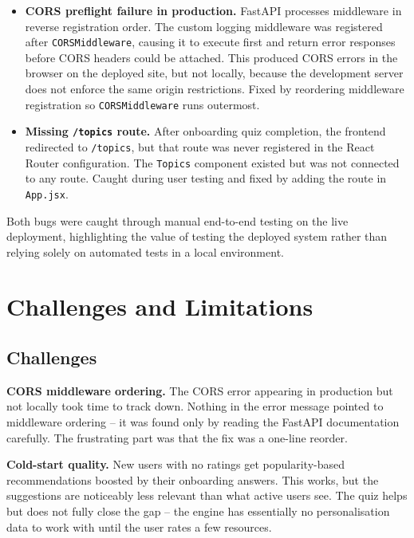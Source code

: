\documentclass[12pt,a4paper]{report}
\begin{document}
\begin{itemize}
  \item \textbf{CORS preflight failure in production.} FastAPI processes middleware in reverse registration order. The custom logging middleware was registered after \texttt{CORSMiddleware}, causing it to execute first and return error responses before CORS headers could be attached. This produced CORS errors in the browser on the deployed site, but not locally, because the development server does not enforce the same origin restrictions. Fixed by reordering middleware registration so \texttt{CORSMiddleware} runs outermost.
  \item \textbf{Missing \texttt{/topics} route.} After onboarding quiz completion, the frontend redirected to \texttt{/topics}, but that route was never registered in the React Router configuration. The \texttt{Topics} component existed but was not connected to any route. Caught during user testing and fixed by adding the route in \texttt{App.jsx}.
\end{itemize}

Both bugs were caught through manual end-to-end testing on the live deployment, highlighting the value of testing the deployed system rather than relying solely on automated tests in a local environment.

\section{Challenges and Limitations}
\label{sec:challenges}

\subsection{Challenges}

\textbf{CORS middleware ordering.} The CORS error appearing in production but not locally took time to track down. Nothing in the error message pointed to middleware ordering -- it was found only by reading the FastAPI documentation carefully. The frustrating part was that the fix was a one-line reorder.

\textbf{Cold-start quality.} New users with no ratings get popularity-based recommendations boosted by their onboarding answers. This works, but the suggestions are noticeably less relevant than what active users see. The quiz helps but does not fully close the gap -- the engine has essentially no personalisation data to work with until the user rates a few resources.
\end{document}
